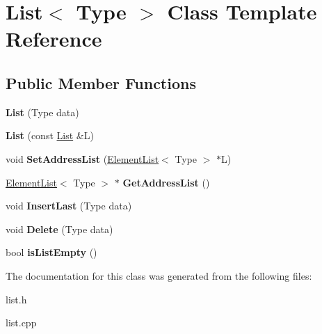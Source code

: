 \hypertarget{class_list}{}\section{List$<$ Type $>$ Class Template Reference}
\label{class_list}
\subsection*{Public Member Functions}
\begin{DoxyCompactItemize}
\item 
{\bfseries List} (Type data)\hypertarget{class_list_afbbfb958dda41678d9a138d3ad6a9b35}{}\label{class_list_afbbfb958dda41678d9a138d3ad6a9b35}

\item 
{\bfseries List} (const \hyperlink{class_list}{List} \&L)\hypertarget{class_list_ae52ebdc014f2709effb6a79917000b55}{}\label{class_list_ae52ebdc014f2709effb6a79917000b55}

\item 
void {\bfseries Set\+Address\+List} (\hyperlink{class_element_list}{Element\+List}$<$ Type $>$ $\ast$L)\hypertarget{class_list_a8e1f80f098c0ef89dccb99d624f1d5ef}{}\label{class_list_a8e1f80f098c0ef89dccb99d624f1d5ef}

\item 
\hyperlink{class_element_list}{Element\+List}$<$ Type $>$ $\ast$ {\bfseries Get\+Address\+List} ()\hypertarget{class_list_a0f935df606117d95921002c4ec8da766}{}\label{class_list_a0f935df606117d95921002c4ec8da766}

\item 
void {\bfseries Insert\+Last} (Type data)\hypertarget{class_list_ae9238dae50d93e0276f9e721f32f5c10}{}\label{class_list_ae9238dae50d93e0276f9e721f32f5c10}

\item 
void {\bfseries Delete} (Type data)\hypertarget{class_list_a00fce1708e871f4574c90942a3b71bb3}{}\label{class_list_a00fce1708e871f4574c90942a3b71bb3}

\item 
bool {\bfseries is\+List\+Empty} ()\hypertarget{class_list_a4cc9e973d8289d39611b7750f01adbec}{}\label{class_list_a4cc9e973d8289d39611b7750f01adbec}

\end{DoxyCompactItemize}


The documentation for this class was generated from the following files\+:\begin{DoxyCompactItemize}
\item 
list.\+h\item 
list.\+cpp\end{DoxyCompactItemize}
